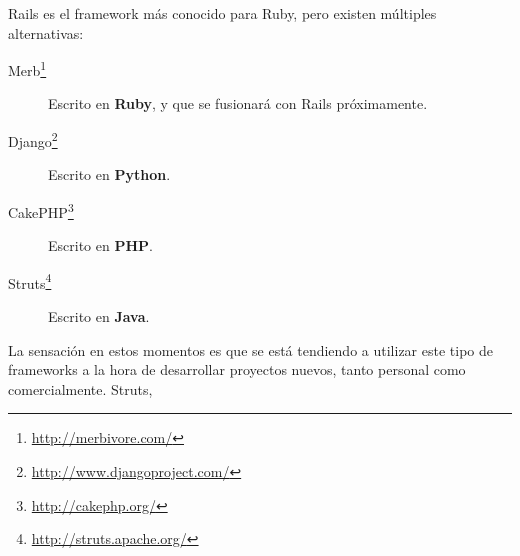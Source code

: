 Rails es el framework más conocido para Ruby, pero existen múltiples alternativas:

\begin{description}
  \item[Merb\footnote{\url{http://merbivore.com/}}] Escrito en \textbf{Ruby}, y que se fusionará con Rails próximamente.
  \item[Django\footnote{\url{http://www.djangoproject.com/}}] Escrito en \textbf{Python}.
  \item[CakePHP\footnote{\url{http://cakephp.org/}}] Escrito en \textbf{PHP}.
  \item[Struts\footnote{\url{http://struts.apache.org/}}] Escrito en \textbf{Java}.
\end{description}

La sensación en estos momentos es que se está tendiendo a utilizar este tipo de frameworks a la hora de desarrollar proyectos nuevos, tanto personal como comercialmente. Struts,

